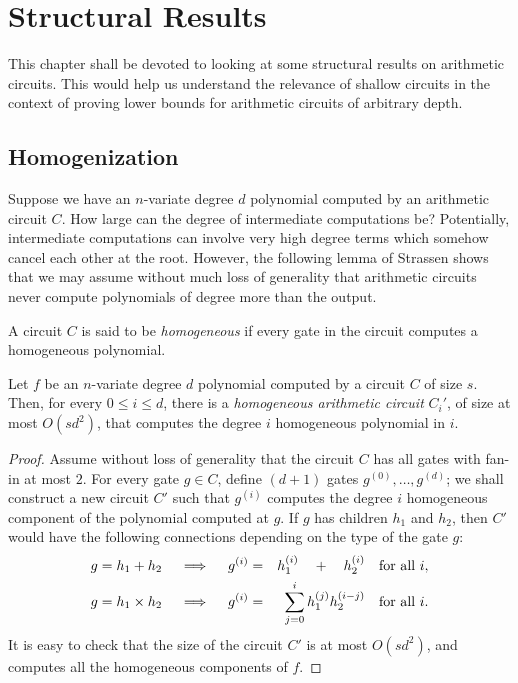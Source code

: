 \chapter{Structural Results}\label{chap:structural-results}


This chapter shall be devoted to looking at some structural results on arithmetic circuits. 
This would help us understand the relevance of shallow circuits in the context of proving lower bounds for arithmetic circuits of arbitrary depth. 

\section{Homogenization}\label{sec:homogenization}

Suppose we have an $n$-variate degree $d$ polynomial computed by an arithmetic circuit $C$. 
How large can the degree of intermediate computations be? 
Potentially, intermediate computations can involve very high degree terms which somehow cancel each other at the root. 
However, the following lemma of Strassen shows that we may assume without much loss of generality that arithmetic circuits never compute polynomials of degree more than the output. 

\begin{definition}
A circuit $C$ is said to be \emph{homogeneous} if every gate in the circuit computes a homogeneous polynomial. 
\end{definition}

\begin{lemma}[Homogenization]\label{lem:homogenization}
Let $f$ be an $n$-variate degree $d$ polynomial computed by a circuit $C$ of size $s$. 
Then, for every $0\leq i \leq d$, there is a \emph{homogeneous arithmetic circuit} $C_i'$, of size at most $O(sd^2)$, that computes the degree $i$ homogeneous polynomial in $i$. 
\end{lemma}
\begin{proof}
Assume without loss of generality that the circuit $C$ has all gates with fan-in at most $2$. 
For every gate $g\in C$, define $(d+1)$ gates $g^{(0)},\dots, g^{(d)}$; we shall construct a new circuit $C'$ such that $g^{(i)}$ computes the degree $i$ homogeneous component of the polynomial computed at $g$. 
If $g$ has children $h_1$ and $h_2$, then $C'$ would have the following connections depending on the type of the gate $g$:
\begin{eqnarray*}
\text{$g = h_1 + h_2$}\quad\implies\quad g^{(i)} &=& h_1^{(i)} \quad + \quad h_2^{(i)}\quad\text{for all $i$},\\
\text{$g = h_1 \times h_2$}\quad\implies\quad g^{(i)} &=& \sum_{j=0}^i h_1^{(j)} h_2^{(i-j)}\quad\text{for all $i$}.
\end{eqnarray*}
It is easy to check that the size of the circuit $C'$ is at most $O(sd^2)$, and computes all the homogeneous components of $f$. 
\end{proof}

